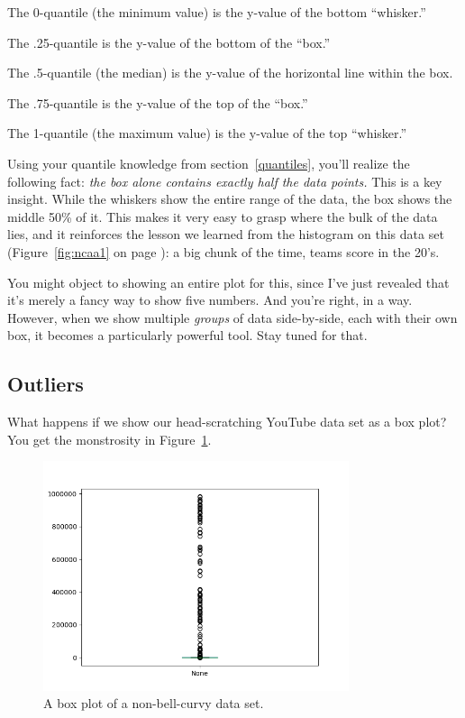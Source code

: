 \begin{compactitem}
\item The 0-quantile (the minimum value) is the y-value of the bottom ``whisker.''
\item The .25-quantile is the y-value of the bottom of the ``box.''
\item The .5-quantile (the median) is the y-value of the horizontal line within
the box.
\item The .75-quantile is the y-value of the top of the ``box.''
\item The 1-quantile (the maximum value) is the y-value of the top ``whisker.''
\end{compactitem}

Using your quantile knowledge from section~\ref{quantiles}, you'll realize the
following fact: \textit{the box alone contains exactly half the data points.}
This is a key insight. While the whiskers show the entire range of the data,
the box shows the middle 50\% of it. This makes it very easy to grasp where the
bulk of the data lies, and it reinforces the lesson we learned from the
histogram on this data set (Figure~\ref{fig:ncaa1} on page
\pageref{fig:ncaa1}): a big chunk of the time, teams score in the 20's.

You might object to showing an entire plot for this, since I've just revealed
that it's merely a fancy way to show five numbers. And you're right, in a way.
However, when we show multiple \textit{groups} of data side-by-side, each with
their own box, it becomes a particularly powerful tool. Stay tuned for that.

\subsection{Outliers}

What happens if we show our head-scratching YouTube data set as a box plot? You
get the monstrosity in Figure~\ref{fig:youtubebox}.

\begin{figure}[ht]
\centering
\includegraphics[width=0.8\textwidth]{youtubebox.png}
\caption{A box plot of a non-bell-curvy data set.}
\label{fig:youtubebox}
\end{figure}

